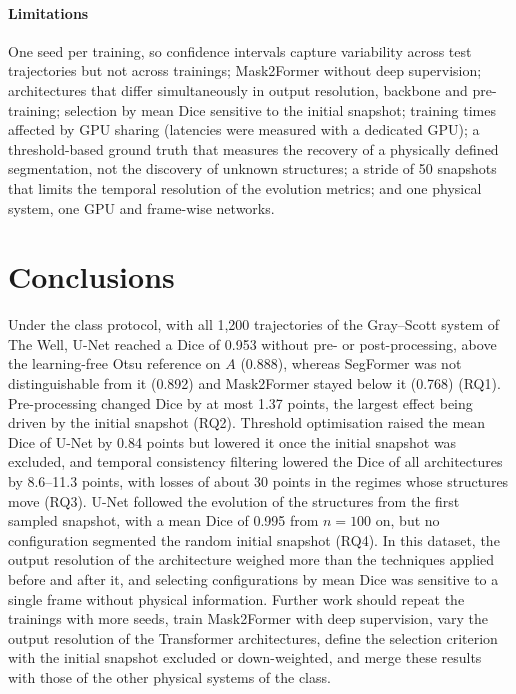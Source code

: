 \documentclass[preprint,12pt,authoryear]{elsarticle}
\begin{document}
\paragraph{Limitations} One seed per training, so confidence intervals capture variability across test trajectories but not across trainings; Mask2Former without deep supervision; architectures that differ simultaneously in output resolution, backbone and pre-training; selection by mean Dice sensitive to the initial snapshot; training times affected by GPU sharing (latencies were measured with a dedicated GPU); a threshold-based ground truth that measures the recovery of a physically defined segmentation, not the discovery of unknown structures; a stride of 50 snapshots that limits the temporal resolution of the evolution metrics; and one physical system, one GPU and frame-wise networks.

\section{Conclusions}
\label{sec:conclusions}

Under the class protocol, with all 1,200 trajectories of the Gray--Scott system of The Well, U-Net reached a Dice of 0.953 without pre- or post-processing, above the learning-free Otsu reference on $A$ (0.888), whereas SegFormer was not distinguishable from it (0.892) and Mask2Former stayed below it (0.768) (RQ1). Pre-processing changed Dice by at most 1.37 points, the largest effect being driven by the initial snapshot (RQ2). Threshold optimisation raised the mean Dice of U-Net by 0.84 points but lowered it once the initial snapshot was excluded, and temporal consistency filtering lowered the Dice of all architectures by 8.6--11.3 points, with losses of about 30 points in the regimes whose structures move (RQ3). U-Net followed the evolution of the structures from the first sampled snapshot, with a mean Dice of 0.995 from $n=100$ on, but no configuration segmented the random initial snapshot (RQ4). In this dataset, the output resolution of the architecture weighed more than the techniques applied before and after it, and selecting configurations by mean Dice was sensitive to a single frame without physical information. Further work should repeat the trainings with more seeds, train Mask2Former with deep supervision, vary the output resolution of the Transformer architectures, define the selection criterion with the initial snapshot excluded or down-weighted, and merge these results with those of the other physical systems of the class.
\end{document}
